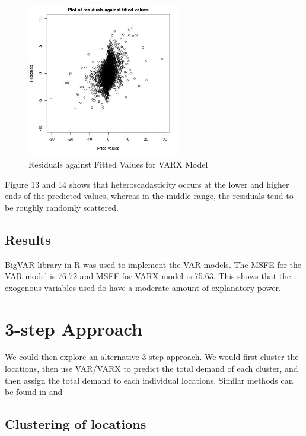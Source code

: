 \documentclass[12pt, letterpaper] {article}
\begin{document}
\begin{figure}[H]
    \centering
    \includegraphics[width=0.6\textwidth, height=0.3\textheight]{Images/Full_VARX_diff_resids_vs_values.jpg}
    \caption{Residuals against Fitted Values for VARX Model}
    \label{fig:Residuals against Fitted Values for VARX Model}
\end{figure}

Figure 13 and 14 shows that heteroscadasticity occurs at the lower and higher ends of the predicted values, whereas in the middle range, the residuals tend to be roughly randomly scattered.

\subsection{Results}
BigVAR library in R was used to implement the VAR models. The MSFE for the VAR model is 76.72 and MSFE for VARX model is 75.63. This shows that the exogenous variables used do have a moderate amount of explanatory power. 

\section{3-step Approach}

We could then explore an alternative 3-step approach. We would first cluster the locations, then use VAR/VARX to predict the total demand of each cluster, and then assign the total demand to each individual locations. Similar methods can be found in \cite{Paul2015} and \cite{Chi2014}

\subsection{Clustering of locations}
\end{document}
